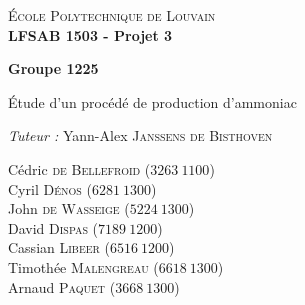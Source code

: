 \begin{titlepage}
    \begin{center}
        \vspace*{1cm}
        
        \large
	\textsc{École Polytechnique de Louvain} \\
	\textbf{LFSAB 1503 - Projet 3} \\        
        \vspace{1cm}
        
        \textbf{Groupe 1225}
        
        \vspace{0.5cm}
        
        \Huge
	Étude d'un procédé de production d'ammoniac
        \vspace{0,5cm}
        
        

        \vfill 
        \large

	\begin{flushright}

	\textit{Tuteur : } Yann-Alex \textsc{Janssens de Bisthoven} \vspace{1\baselineskip}

	Cédric \textsc{de Bellefroid}  ($3263~1100$) \\
	Cyril \textsc{Dénos}  ($6281~1300$) \\
	John \textsc{de Wasseige}  ($5224~1300$) \\
	David \textsc{Dispas}  ($7189~1200$) \\
	Cassian \textsc{Libeer}   ($6516~1200$) \\
	Timothée \textsc{Malengreau}  ($6618~1300$) \\
	Arnaud \textsc{Paquet}  ($3668~1300$) \\       
	\end{flushright}
        
    \end{center}
\end{titlepage}
